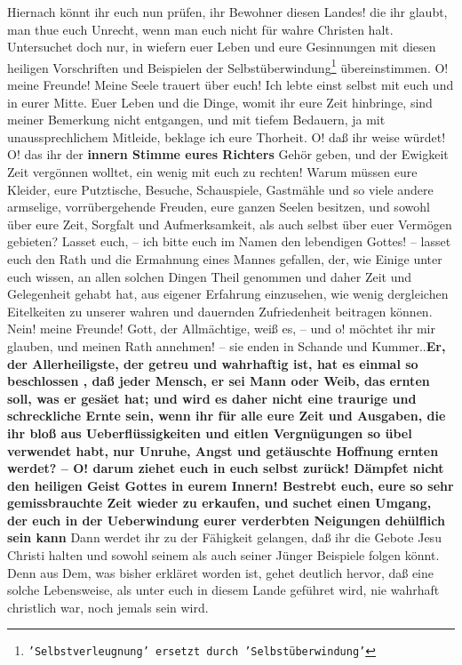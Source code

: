 Hiernach könnt ihr euch nun prüfen, ihr Bewohner diesen Landes! die ihr glaubt,
man thue euch Unrecht, wenn man euch nicht für wahre Christen halt. Untersuchet
doch nur, in wiefern euer Leben und eure Gesinnungen mit diesen heiligen
Vorschriften und Beispielen der Selbstüberwindung\footnote{\texttt{'Selbstverleugnung' ersetzt durch 'Selbstüberwindung'}} übereinstimmen. O! meine
Freunde! Meine Seele trauert über euch! Ich lebte einst selbst mit euch und in
eurer Mitte. Euer Leben und die Dinge, womit ihr eure Zeit hinbringe, sind
meiner Bemerkung nicht entgangen, und mit tiefem Bedauern, ja mit
unaussprechlichem Mitleide, beklage ich eure Thorheit. O! daß ihr weise würdet!
O! das ihr der \textbf{innern Stimme eures Richters} Gehör geben, und der Ewigkeit Zeit
vergönnen wolltet, ein wenig mit euch zu rechten! Warum müssen eure Kleider,
eure Putztische, Besuche, Schauspiele, Gastmähle und so viele andere armselige,
vorrübergehende Freuden, eure ganzen Seelen besitzen, und sowohl über eure Zeit,
Sorgfalt und Aufmerksamkeit, als auch selbst über euer Vermögen gebieten? Lasset
euch, -- ich bitte euch im Namen den lebendigen Gottes! -- lasset euch den Rath
und die Ermahnung eines Mannes gefallen, der, wie Einige unter euch wissen, an
allen solchen Dingen Theil genommen und daher Zeit und Gelegenheit gehabt hat,
aus eigener Erfahrung einzusehen, wie wenig dergleichen Eitelkeiten zu unserer
wahren und dauernden Zufriedenheit beitragen können. Nein! meine Freunde! Gott,
der Allmächtige, weiß es, -- und o! möchtet ihr mir glauben, und meinen Rath
annehmen! -- sie enden in Schande und Kummer..\textbf{Er, der Allerheiligste, der getreu
und wahrhaftig ist, hat es einmal so beschlossen , daß jeder Mensch, er sei Mann
oder Weib, das ernten soll, was er gesäet hat; und wird es daher nicht eine
traurige und schreckliche Ernte sein, wenn ihr für alle eure Zeit und Ausgaben,
die ihr bloß aus Ueberflüssigkeiten und eitlen Vergnügungen so übel verwendet
habt, nur Unruhe, Angst und getäuschte Hoffnung ernten werdet? -- O! darum
ziehet euch in euch selbst zurück! Dämpfet nicht den heiligen Geist Gottes in
eurem Innern! Bestrebt  euch, eure so sehr gemissbrauchte Zeit wieder zu
erkaufen, und suchet einen Umgang, der euch in der Ueberwindung eurer verderbten
Neigungen dehülflich sein kann} Dann werdet ihr zu der Fähigkeit gelangen, daß
ihr die Gebote Jesu Christi halten und sowohl seinem als auch seiner Jünger
Beispiele folgen könnt. Denn aus Dem, was bisher erkläret worden ist, gehet
deutlich hervor, daß eine solche Lebensweise, als unter euch in diesem Lande
geführet wird, nie wahrhaft christlich war, noch jemals sein wird.

